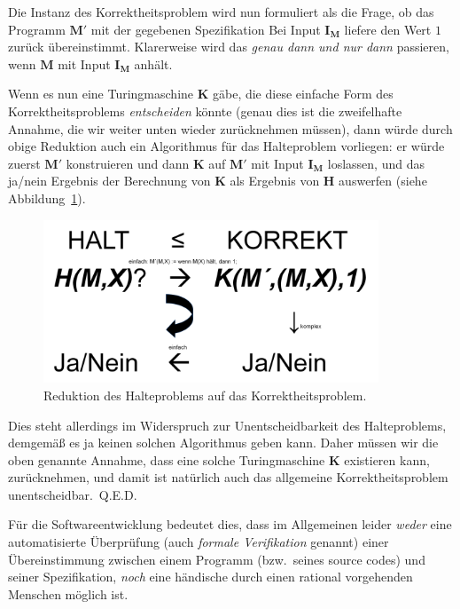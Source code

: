 Die Instanz des Korrektheitsproblem wird nun formuliert als die Frage, ob das Programm $\mathbf{M'}$ mit der gegebenen Spezifikation \glqq{}Bei Input $\mathbf{I_M}$ liefere den Wert $1$ zurück\grqq{} übereinstimmt. Klarerweise wird das \emph{genau dann und nur dann} passieren, wenn $\mathbf{M}$ mit Input $\mathbf{I_M}$ anhält. 

Wenn es nun eine Turingmaschine $\mathbf{K}$ gäbe, die diese einfache Form des Korrektheitspro\-blems \emph{entscheiden} könnte (genau dies ist die zweifelhafte Annahme, die wir weiter unten wieder zurücknehmen müssen), dann würde durch obige Reduktion auch ein Algorithmus für das Halteproblem vorliegen: er würde zuerst $\mathbf{M'}$ konstruieren und dann $\mathbf{K}$ auf $\mathbf{M'}$ mit Input $\mathbf{I_M}$ loslassen, und das ja/nein Ergebnis der Berechnung von $\mathbf{K}$ als Ergebnis von $\mathbf{H}$ auswerfen (siehe Abbildung~\ref{fig:correctnessproblem}). 

\begin{figure}[t]
\centering
\includegraphics[width=10cm]{img/correctnessproblem.png}
\caption{Reduktion des Halteproblems auf das Korrektheitsproblem.}
\label{fig:correctnessproblem}
\end{figure}

Dies steht allerdings im Widerspruch zur Unentscheidbarkeit des Halteproblems, demge\-mäß es ja keinen solchen Algorithmus geben kann. Daher müssen wir die oben genannte Annahme, dass eine solche Turingmaschine $\mathbf{K}$ existieren kann, zurücknehmen, und damit ist natürlich auch das allgemeine Korrektheitsproblem unentscheidbar.~Q.E.D.\newline

\noindent Für die Softwareentwicklung bedeutet dies, dass im Allgemeinen leider \emph{weder} eine automatisierte Überprüfung (auch \emph{formale Verifikation} genannt) einer Übereinstimmung zwischen einem Programm (bzw.\ seines source codes) und seiner Spezifikation, \emph{noch} eine händische durch einen rational vorgehenden Menschen möglich ist.

